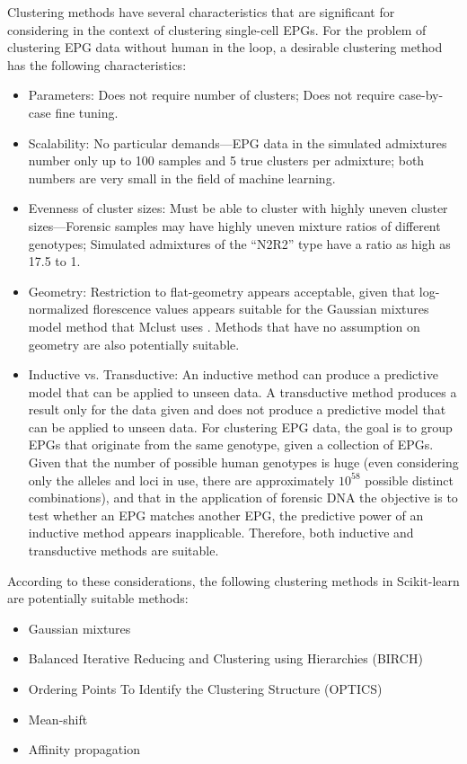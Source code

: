 Clustering methods have several characteristics that are significant for considering in the context of clustering single-cell EPGs. For the problem of clustering EPG data without human in the loop, a desirable clustering method has the following characteristics:
\begin{itemize}
  \item Parameters: Does not require number of clusters; Does not require case-by-case fine tuning.
  \item Scalability: No particular demands---EPG data in the simulated admixtures number only up to 100 samples and 5 true clusters per admixture; both numbers are very small in the field of machine learning.
  \item Evenness of cluster sizes: Must be able to cluster with highly uneven cluster sizes---Forensic samples may have highly uneven mixture ratios of different genotypes; Simulated admixtures of the ``N2R2'' type have a ratio as high as 17.5 to 1.
  \item Geometry: Restriction to flat-geometry appears acceptable, given that log-normalized florescence values appears suitable for the Gaussian mixtures model method that Mclust uses \cite{odonnell_clustering_2021}. Methods that have no assumption on geometry are also potentially suitable.
  \item Inductive vs. Transductive: An inductive method can produce a predictive model that can be applied to unseen data. A transductive method produces a result only for the data given and does not produce a predictive model that can be applied to unseen data. For clustering EPG data, the goal is to group EPGs that originate from the same genotype, given a collection of EPGs. Given that the number of possible human genotypes is huge (even considering only the alleles and loci in use, there are approximately $10^{58}$ possible distinct combinations), and that in the application of forensic DNA the objective is to test whether an EPG matches another EPG, the predictive power of an inductive method appears inapplicable. Therefore, both inductive and transductive methods are suitable.
\end{itemize}

According to these considerations, the following clustering methods in Scikit-learn are potentially suitable methods:

\begin{itemize}
  \item Gaussian mixtures
  \item Balanced Iterative Reducing and Clustering using Hierarchies (BIRCH) \cite{zhang_birch_1996}
  \item Ordering Points To Identify the Clustering Structure (OPTICS) \cite{ankerst_optics_1999}
  \item Mean-shift \cite{comaniciu_mean_2002}
  \item Affinity propagation \cite{frey_clustering_2007} 
\end{itemize}

